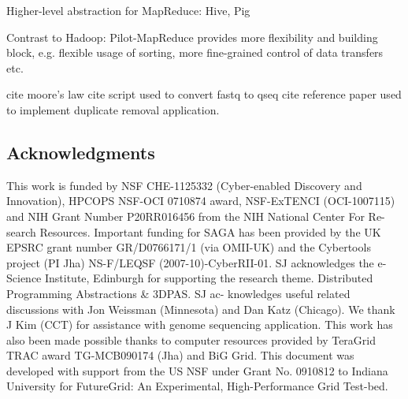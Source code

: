 \documentclass{acm_proc_article-sp}
\begin{document}
Higher-level abstraction for MapReduce: Hive, Pig


Contrast to Hadoop:
Pilot-MapReduce provides more flexibility and building block, e.g. flexible 
usage of sorting, more fine-grained control of data transfers etc.

%

%
%


cite moore's law
cite script used to convert fastq to qseq
cite reference paper used to implement duplicate removal application.


\subsection*{Acknowledgments}
\scriptsize
This work is funded by NSF CHE-1125332 (Cyber-enabled Discovery and
Innovation), HPCOPS NSF-OCI 0710874 award, NSF-ExTENCI (OCI-1007115) and NIH
Grant Number P20RR016456 from the NIH National Center For Re- search
Resources. Important funding for SAGA has been provided by the UK EPSRC grant
number GR/D0766171/1 (via OMII-UK) and the Cybertools project (PI Jha) 
NS-F/LEQSF (2007-10)-CyberRII-01. SJ acknowledges the e-Science Institute,
Edinburgh for supporting the research theme. Distributed Programming
Abstractions \& 3DPAS. SJ ac- knowledges useful related discussions with Jon
Weissman (Minnesota) and Dan Katz (Chicago). We thank J Kim (CCT) for
assistance with genome sequencing application. This work has also been made
possible thanks to computer resources provided by TeraGrid TRAC award
TG-MCB090174 (Jha) and BiG Grid. This document was developed with support from
the US NSF under Grant No. 0910812 to Indiana University for FutureGrid: An
Experimental, High-Performance Grid Test-bed.
\end{document}

